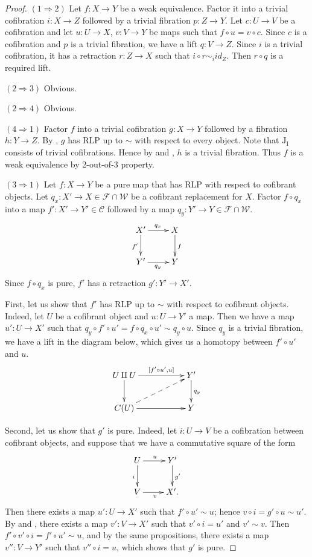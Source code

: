 \documentclass{amsart}
\theoremstyle{definition}
\newcommand{\we}{\mathcal{W}}
\newcommand{\fib}{\mathcal{F}}
\newcommand{\cof}{\mathcal{C}}
\newcommand{\I}{\mathrm{I}}
\newcommand{\J}{\mathrm{J}}
\begin{document}
\begin{proof}
$(1 \Rightarrow 2)$
Let $f : X \to Y$ be a weak equivalence.
Factor it into a trivial cofibration $i : X \to Z$ followed by a trivial fibration $p : Z \to Y$.
Let $c : U \to V$ be a cofibration and let $u : U \to X$, $v : V \to Y$ be maps such that $f \circ u = v \circ c$.
Since $c$ is a cofibration and $p$ is a trivial fibration, we have a lift $q : V \to Z$.
Since $i$ is a trivial cofibration, it has a retraction $r : Z \to X$ such that $i \circ r \sim_i id_Z$.
Then $r \circ q$ is a required lift.

$(2 \Rightarrow 3)$ Obvious.

$(2 \Rightarrow 4)$ Obvious.

$(4 \Rightarrow 1)$
Factor $f$ into a trivial cofibration $g : X \to Y$ followed by a fibration $h : Y \to Z$.
By , $g$ has RLP up to $\sim$ with respect to every object.
Note that $\J_\I$ consists of trivial cofibrations.
Hence by  and , $h$ is a trivial fibration.
Thus $f$ is a weak equivalence by 2-out-of-3 property.

$(3 \Rightarrow 1)$
Let $f : X \to Y$ be a pure map that has RLP with respect to cofibrant objects.
Let $q_x : X' \to X \in \fib \cap \we$ be a cofibrant replacement for $X$.
Factor $f \circ q_x$ into a map $f' : X' \to Y' \in \cof$ followed by a map $q_y : Y' \to Y \in \fib \cap \we$.
\[ \xymatrix{ X' \ar[r]^{q_x} \ar[d]_{f'} & X \ar[d]^f \\
              Y' \ar[r]_{q_y}             & Y
            } \]
Since $f \circ q_x$ is pure, $f'$ has a retraction $g' : Y' \to X'$.

First, let us show that $f'$ has RLP up to $\sim$ with respect to cofibrant objects.
Indeed, let $U$ be a cofibrant object and $u : U \to Y'$ a map.
Then we have a map $u' : U \to X'$ such that $q_y \circ f' \circ u' = f \circ q_x \circ u' \sim q_y \circ u$.
Since $q_y$ is a trivial fibration, we have a lift in the diagram below, which gives us a homotopy between $f' \circ u'$ and $u$.
\[ \xymatrix{ U \amalg U \ar[rr]^-{[f' \circ u', u]} \ar[d] & & Y' \ar[d]^{q_y} \\
              C(U)       \ar[rr] \ar@{-->}[urr]             & & Y
            } \]

Second, let us show that $g'$ is pure.
Indeed, let $i : U \to V$ be a cofibration between cofibrant objects, and suppose that we have a commutative square of the form
\[ \xymatrix{ U \ar[r]^u \ar[d]_i & Y' \ar[d]^{g'} \\
              V \ar[r]_v          & X'.
            } \]
Then there exists a map $u' : U \to X'$ such that $f' \circ u' \sim u$; hence $v \circ i = g' \circ u \sim u'$.
By  and , there exists a map $v' : V \to X'$ such that $v' \circ i = u'$ and $v' \sim v$.
Then $f' \circ v' \circ i = f' \circ u' \sim u$, and by the same propositions, there exists a map $v'' : V \to Y'$ such that $v'' \circ i = u$, which shows that $g'$ is pure.


\end{proof}
\end{document}
